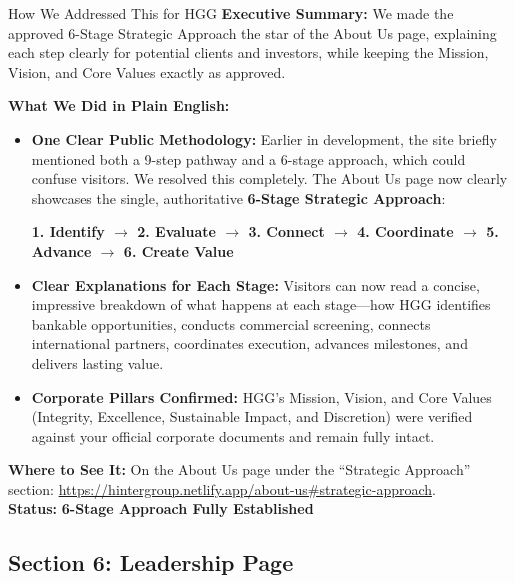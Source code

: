 \documentclass[11pt,a4paper]{article}
\begin{document}
\begin{DetailedResolutionBox}{How We Addressed This for HGG}
\textbf{Executive Summary:} We made the approved 6-Stage Strategic Approach the star of the About Us page, explaining each step clearly for potential clients and investors, while keeping the Mission, Vision, and Core Values exactly as approved.

\textbf{What We Did in Plain English:}
\begin{itemize}
    \item \textbf{One Clear Public Methodology:} Earlier in development, the site briefly mentioned both a 9-step pathway and a 6-stage approach, which could confuse visitors. We resolved this completely. The About Us page now clearly showcases the single, authoritative \textbf{6-Stage Strategic Approach}:
    \begin{center}
    \textbf{1. Identify $\longrightarrow$ 2. Evaluate $\longrightarrow$ 3. Connect $\longrightarrow$ 4. Coordinate $\longrightarrow$ 5. Advance $\longrightarrow$ 6. Create Value}
    \end{center}
    \item \textbf{Clear Explanations for Each Stage:} Visitors can now read a concise, impressive breakdown of what happens at each stage---how HGG identifies bankable opportunities, conducts commercial screening, connects international partners, coordinates execution, advances milestones, and delivers lasting value.
    \item \textbf{Corporate Pillars Confirmed:} HGG's Mission, Vision, and Core Values (Integrity, Excellence, Sustainable Impact, and Discretion) were verified against your official corporate documents and remain fully intact.
\end{itemize}

\textbf{Where to See It:} On the About Us page under the ``Strategic Approach'' section: \url{https://hintergroup.netlify.app/about-us#strategic-approach}. \\
\textbf{Status:} \textcolor{HGGGreen}{\textbf{6-Stage Approach Fully Established}}
\end{DetailedResolutionBox}

\vspace{0.3cm}

\subsection{Section 6: Leadership Page}
\end{document}

